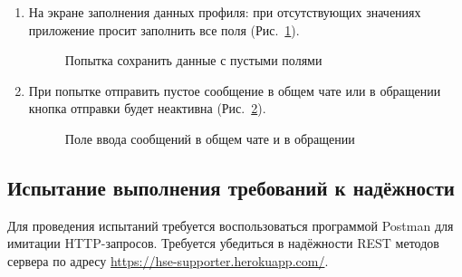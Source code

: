 \documentclass{../includes/TechDoc}
\begin{document}
\begin{enumerate}
        \item На экране заполнения данных профиля: при отсутствующих значениях приложение просит заполнить все поля (Рис.~\ref{fig:wait_page_empty_labels}).
        \begin{figure}[h]
            \centering
            \caption{Попытка сохранить данные с пустыми полями}
            \label{fig:wait_page_empty_labels}
        \end{figure}

        \item При попытке отправить пустое сообщение в общем чате или в обращении кнопка отправки будет неактивна (Рис.~\ref{fig:input_text}).
        \begin{figure}[h]
            \centering
            \caption{Поле ввода сообщений в общем чате и в обращении}
            \label{fig:input_text}
        \end{figure}
    \end{enumerate}

    \clearpage

    \subsection{Испытание выполнения требований к надёжности}

    Для проведения испытаний требуется воспользоваться программой Postman для имитации HTTP-запросов.
    Требуется убедиться в надёжности REST методов сервера по адресу \url{https://hse-supporter.herokuapp.com/}.
\end{document}
